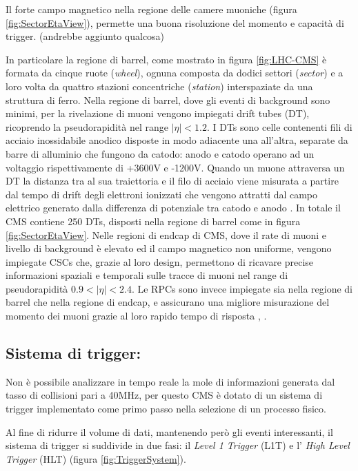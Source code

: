 Il forte campo magnetico nella regione delle camere muoniche (figura \ref{fig:SectorEtaView}), permette una buona risoluzione del momento e capacità di trigger. (andrebbe aggiunto qualcosa)


In particolare la regione di barrel, come mostrato in figura \ref{fig:LHC-CMS} è formata da cinque ruote (\textit{wheel}), ognuna composta da dodici settori (\textit{sector}) e a loro volta da quattro stazioni concentriche (\textit{station}) interspaziate da una struttura di ferro. Nella regione di barrel, dove gli eventi di background sono minimi, per la rivelazione di muoni vengono impiegati drift tubes (DT), ricoprendo la pseudorapidità nel range $|\eta| < 1.2$. I DTs sono celle contenenti fili di acciaio inossidabile anodico disposte in modo adiacente una all'altra, separate da barre di alluminio che fungono da catodo: anodo e catodo operano ad un voltaggio rispettivamente di +3600V e -1200V. Quando un muone attraversa un DT la distanza tra al sua traiettoria e il filo di acciaio viene misurata a partire dal tempo di drift degli elettroni ionizzati che vengono attratti dal campo elettrico generato dalla differenza di potenziale tra catodo e anodo \cite{MasterThesisNicLai}. 
In totale il CMS contiene 250 DTs, disposti nella regione di barrel come in figura \ref{fig:SectorEtaView}. Nelle regioni di endcap di CMS, dove il rate di muoni e livello di background è elevato ed il campo magnetico non uniforme, vengono impiegate CSCs che, grazie al loro design, permettono di ricavare precise informazioni spaziali e temporali sulle tracce di muoni nel range di pseudorapidità $0.9 < |\eta| < 2.4$. Le RPCs sono invece impiegate sia nella regione di barrel che nella regione di endcap, e assicurano una migliore misurazione del momento dei muoni grazie al loro rapido tempo di risposta \cite{MasterThesisNicLai}, \cite{cms2008cms}.


\subsection{Sistema di trigger:}

Non è possibile analizzare in tempo reale la mole di informazioni generata dal tasso di collisioni pari a 40MHz, per questo CMS è dotato di un sistema di trigger implementato come primo passo nella selezione di un processo fisico. 

Al fine di ridurre il volume di dati, mantenendo però gli eventi interessanti, il sistema di trigger si suddivide in due fasi: il \textit{Level 1 Trigger} (L1T) e l' \textit{High Level Trigger} (HLT) (figura \ref{fig:TriggerSystem}). 

